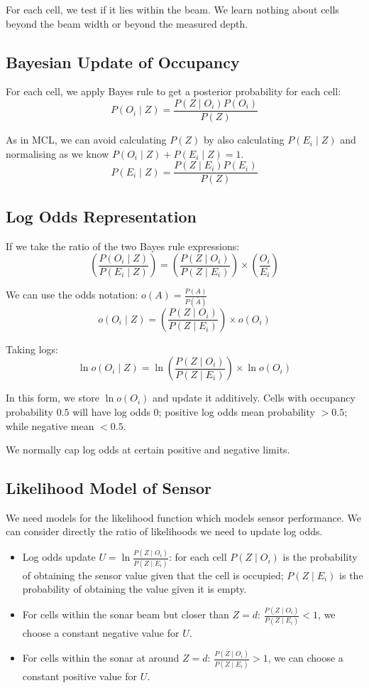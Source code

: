 \documentclass[11pt]{article}
\begin{document}
For each cell, we test if it lies within the beam.
We learn nothing about cells beyond the beam width or beyond the measured depth.

\subsection{Bayesian Update of Occupancy}
For each cell, we apply Bayes rule to get a posterior probability for each cell:
\[
  P(O_i \mid Z) = \frac{P(Z \mid O_i) P(O_i)}{P(Z)}
\]

As in MCL, we can avoid calculating $P(Z)$ by also calculating $P(E_i \mid Z)$ and normalising as we know $P(O_i \mid Z) + P(E_i \mid Z) = 1$.
\[
  P(E_i \mid Z) = \frac{P(Z \mid E_i) P(E_i)}{P(Z)}
\]

\subsection{Log Odds Representation}
If we take the ratio of the two Bayes rule expressions:
\[
  \left( \frac{P(O_i \mid Z)}{P(E_i \mid Z)}\right) = 
  \left( \frac{P(Z \mid O_i)}{P(Z \mid E_i)}\right)
  \times
  \left( \frac{O_i}{E_i}\right)
\]

We can use the odds notation: $o(A) = \frac{P(A)}{P(\bar{A})}$
\[
  o(O_i \mid Z) = 
  \left( \frac{P(Z \mid O_i)}{P(Z \mid E_i)}\right)
  \times
  o(O_i)
\]

Taking logs:
\[
  \ln o(O_i \mid Z) = 
  \ln \left( \frac{P(Z \mid O_i)}{P(Z \mid E_i)}\right)
  \times
  \ln o(O_i)
\]

In this form, we store $\ln o(O_i)$ and update it additively.
Cells with occupancy probability $0.5$ will have log odds 0; positive log odds mean probability $> 0.5$; while negative mean $< 0.5$.

We normally cap log odds at certain positive and negative limits.

\subsection{Likelihood Model of Sensor}
We need models for the likelihood function which models sensor performance.
We can consider directly the ratio of likelihoods we need to update log odds.
\begin{itemize}
  \item Log odds update $U = \ln \frac{P(Z \mid O_i)}{P(Z \mid E_i)}$: for each cell $P(Z \mid O_i)$ is the probability of obtaining the sensor value given that the cell is occupied; $P(Z \mid E_i)$ is the probability of obtaining the value given it is empty.
  \item For cells within the sonar beam but closer than $Z = d$: $\frac{P(Z \mid O_i)}{P(Z \mid E_i)} < 1$, we choose a constant negative value for $U$.
  \item For cells within the sonar at around $Z = d$: $\frac{P(Z \mid O_i)}{P(Z \mid E_i)} > 1$, we can choose a constant positive value for $U$.
\end{itemize}
\end{document}
